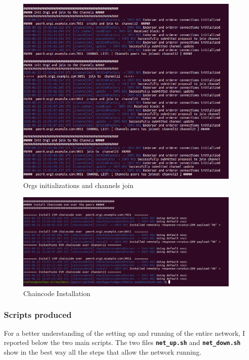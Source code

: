 \begin{figure}[!ht]
    \centering
    \includegraphics[totalheight=8cm]{img/network/net-2.png}
    \caption{Orgs initializations and channels join}
    \label{fig:init-org}
\end{figure}

\begin{figure}[!ht]
    \centering
    \includegraphics[totalheight=6cm]{img/network/net-3.png}
    \caption{Chaincode Installation}
    \label{fig:install-chaincode}
\end{figure}

\newpage
\subsubsection{Scripts produced}

For a better understanding of the setting up and running of the entire network, I reported below the two main scripts. 
The two files \textbf{\texttt{net\_up.sh}} and \textbf{\texttt{net\_down.sh}} show in the best way all the steps that 
allow the network running.


